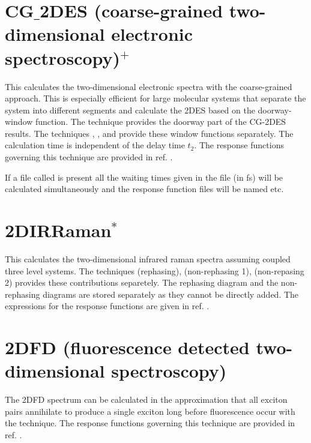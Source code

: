\section{CG$\_$2DES (coarse-grained two-dimensional electronic spectroscopy)$^{+}$}
This calculates the two-dimensional electronic spectra with the coarse-grained approach.\cite{Zhong.2024.J.Chem.TheoryComput..20.6111}
This is especially efficient for large molecular systems that separate the system into different segments and calculate the 2DES based on the doorway-window function.
The technique  provides the doorway part of the CG-2DES results.
The techniques , , and  provide these window functions separately.
The calculation time is independent of the delay time $t_2$.
The response functions governing this technique are provided in ref. \cite{Zhong.2024.J.Chem.TheoryComput..20.6111}.

If a file called  is present all the waiting times given in the file (in fs) will be calculated simultaneously and the response function files will be named  etc.

\section{2DIRRaman$^{*}$}
This calculates the two-dimensional infrared raman spectra assuming coupled three level systems.
The techniques  (rephasing),  (non-rephasing 1),  (non-repasing 2) provides these contributions separetely.
The rephasing diagram and the non-rephasing diagrams are stored separately as they cannot be directly added.
The expressions for the response functions are given in ref. \cite{vanHengel.2023.J.Chem.Phys..158.064106}.

\section{2DFD (fluorescence detected two-dimensional spectroscopy)}
 The 2DFD spectrum can be calculated in the approximation that all exciton pairs annihilate to produce a single exciton long before fluorescence occur with the  technique.
 The response functions governing this technique are provided in ref. \cite{Kunsel_2018}.
